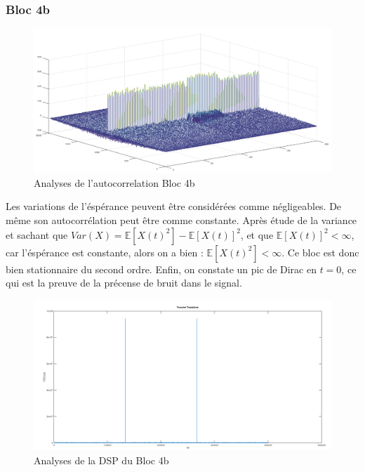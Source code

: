 \documentclass[french, a4paper, 12pt, openany]{book}
\begin{document}
	\subsubsection{Bloc 4b}

	\begin{figure}[ht]
		\begin{center}
		\includegraphics[scale=0.25]{images/AutoCorrBloc4-2.png}
		\end{center}
		\caption{Analyses de l'autocorrelation Bloc 4b}
		\label{Analyses de l'autocorrelation Bloc 4b}
	\end{figure}

	Les variations de l'éspérance peuvent être considérées comme négligeables. De même son autocorrélation peut être comme constante.
	Après étude de la variance et sachant que \begin{math}Var(X) = \mathbb{E}[X(t)^2] - \mathbb{E}[X(t)]^2\end{math}, et que \begin{math}\mathbb{E}[X(t)]^2<\infty\end{math}, car l'éspérance est constante, alors on a bien : \begin{math}\mathbb{E}[X(t)^2]<\infty\end{math}. Ce bloc est donc bien stationnaire du second ordre.
	Enfin, on constate un pic de Dirac en \(t = 0\), ce qui est la preuve de la précense de bruit dans le signal.

	\begin{figure}[ht]
		\begin{center}
		\includegraphics[scale=0.25]{images/DSPBloc4-2.png}
		\end{center}
		\caption{Analyses de la DSP du Bloc 4b}
		\label{Analyses de la DSP du Bloc 4b}
	\end{figure}
\end{document}
